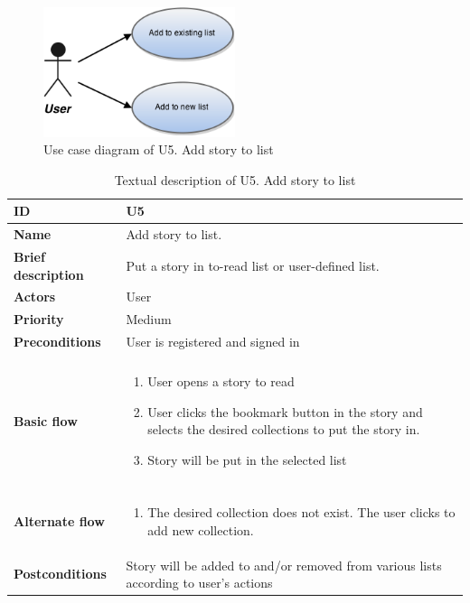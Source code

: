 \begin{figure}[htp]
	\includegraphics[width=0.5\textwidth]{fig/U5}
	\centering
	\caption{Use case diagram of U5. Add story to list}
	\label{Fig:U5}
\end{figure}

\begin{table}[htp]
	\centering
	\caption{Textual description of U5. Add story to list}
	\begin{tabular}[b]{|l | l|}\hline
		\textbf{ID} 				& U5									\\\hline
		\textbf{Name} 				& Add story to list.					\\\hline
		\textbf{Brief description}	& Put a story in to-read list or user-defined  list. 		\\\hline
		\textbf{Actors} 			& User									\\\hline
		\textbf{Priority}			& Medium								\\\hline
		\textbf{Preconditions}		& User is registered and signed in		\\\hline&\\[-2ex]
		\textbf{Basic flow}			& \begin{minipage}{5in}
			\begin{enumerate}[noitemsep]
				\item User opens a story to read
				\item User clicks the bookmark button in the story and selects the desired collections to put the story in.
				\item Story will be put in the selected list
			\end{enumerate}						
		\end{minipage}						\\\hline&\\[-2ex]
		\textbf{Alternate flow}		& \begin{minipage}{5in}
			\begin{enumerate}[noitemsep]
				\item The desired collection does not exist. The user clicks to add new collection.
			\end{enumerate}
		\end{minipage}							\\\hline
		\textbf{Postconditions}		& Story will be added to and/or removed from various lists according to user's actions\\\hline
	\end{tabular}
	\label{Tab:U5}
\end{table}

